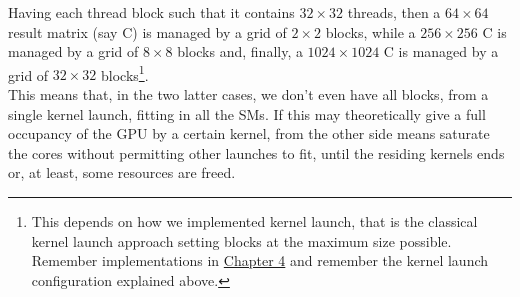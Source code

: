 Having each thread block such that it contains \(32\times32\) threads, then a \(64\times64\) result matrix (say C) is managed by a grid of \(2\times2\) blocks, while a \(256\times256\) C is managed by a grid of \(8\times8\) blocks and, finally, a \(1024\times1024\) C is managed by a grid of \(32\times32\) blocks\footnote{This depends on how we implemented kernel launch, that is the classical kernel launch approach setting blocks at the maximum size possible. Remember implementations in \hyperref[chap:impl]{Chapter 4} and remember the kernel launch configuration explained above.}.\\
This means that, in the two latter cases, we don't even have all blocks, from a single kernel launch, fitting in all the SMs. If this may theoretically give a full occupancy of the GPU by a certain kernel, from the other side means saturate the cores without permitting other launches to fit, until the residing kernels ends or, at least, some resources are freed.

